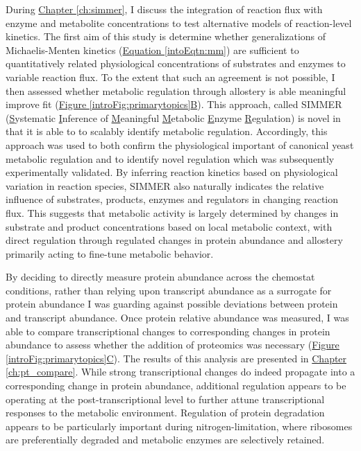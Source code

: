 During \hyperref[ch:simmer]{Chapter \ref{ch:simmer}}, I discuss the integration of reaction flux with enzyme and metabolite concentrations to test alternative models of reaction-level kinetics. The first aim of this study is determine whether generalizations of Michaelis-Menten kinetics (\hyperref[intoEqtn:mm]{Equation \ref{intoEqtn:mm}}) \cite{Liebermeister:2006fm} are sufficient to quantitatively related physiological concentrations of substrates and enzymes to variable reaction flux.  To the extent that such an agreement is not possible, I then assessed whether metabolic regulation through allostery is able meaningful improve fit (\hyperref[introFig:primarytopics]{Figure \ref{introFig:primarytopics}B}).  This approach, called SIMMER (\underline{S}ystematic \underline{I}nference of \underline{M}eaningful \underline{M}etabolic \underline{E}nzyme \underline{R}egulation) is novel in that it is able to to scalably identify metabolic regulation. Accordingly, this approach was used to both confirm the physiological important of canonical yeast metabolic regulation and to identify novel regulation which was subsequently experimentally validated. By inferring reaction kinetics based on physiological variation in reaction species, SIMMER also naturally indicates the relative influence of substrates, products, enzymes and regulators in changing reaction flux. This suggests that metabolic activity is largely determined by changes in substrate and product concentrations based on local metabolic context, with direct regulation through regulated changes in protein abundance and allostery primarily acting to fine-tune metabolic behavior.

By deciding to directly measure protein abundance across the chemostat conditions, rather than relying upon transcript abundance as a surrogate for protein abundance I was guarding against possible deviations between protein and transcript abundance. Once protein relative abundance was measured, I was able to compare transcriptional changes to corresponding changes in protein abundance to assess whether the addition of proteomics was necessary (\hyperref[introFig:primarytopics]{Figure \ref{introFig:primarytopics}C}). The results of this analysis are presented in \hyperref[ch:pt_compare]{Chapter \ref{ch:pt_compare}}.  While strong transcriptional changes do indeed propagate into a corresponding change in protein abundance, additional regulation appears to be operating at the post-transcriptional level to further attune transcriptional responses to the metabolic environment. Regulation of protein degradation appears to be particularly important during nitrogen-limitation, where ribosomes are preferentially degraded and metabolic enzymes are selectively retained.

